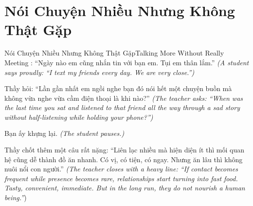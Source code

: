 \section{Nói Chuyện Nhiều Nhưng Không Thật Gặp}
\begin{truyen}{Nói Chuyện Nhiều Nhưng Không Thật Gặp}{Talking More Without Really Meeting}
: ``Ngày nào em cũng nhắn tin với bạn em. Tụi em thân lắm.''
\textit{(A student says proudly: ``I text my friends every day. We are very close.'')}

Thầy hỏi: ``Lần gần nhất em ngồi nghe bạn đó nói hết một chuyện buồn mà không vừa nghe vừa cầm điện thoại là khi nào?''
\textit{(The teacher asks: ``When was the last time you sat and listened to that friend all the way through a sad story without half-listening while holding your phone?'')}

Bạn ấy khựng lại.
\textit{(The student pauses.)}


Thầy chốt thêm một câu rất nặng: ``Liên lạc nhiều mà hiện diện ít thì mối quan hệ cũng dễ thành đồ ăn nhanh. Có vị, có tiện, có ngay. Nhưng ăn lâu thì không nuôi nổi con người.''
\textit{(The teacher closes with a heavy line: ``If contact becomes frequent while presence becomes rare, relationships start turning into fast food. Tasty, convenient, immediate. But in the long run, they do not nourish a human being.''})
\end{truyen}

